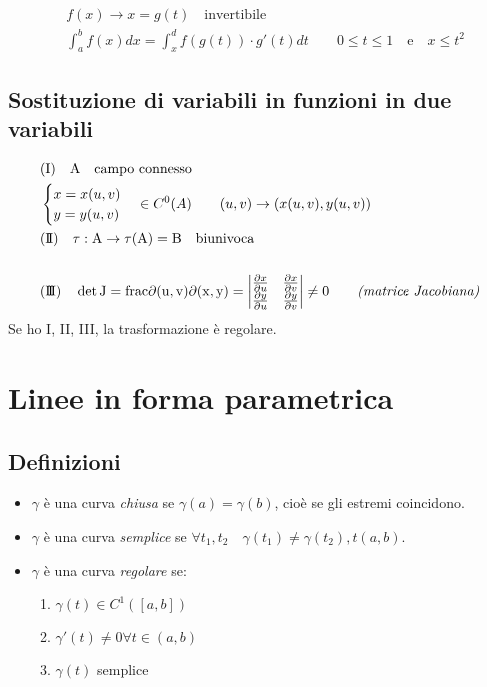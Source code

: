 \documentclass[10pt,a4paper,fleqn]{article}
\begin{document}
	\begin{equation}
	\begin{split}
	&f(x) \longrightarrow x = g(t) \quad \text{invertibile}\\
	&\int_a^b f(x)dx = \int_x^d f(g(t))\cdot g'(t)dt \qquad 0 \leq t \leq 1 \quad\text{e}\quad x \leq t^2
	\end{split}
	\end{equation}

	\subsection{Sostituzione di variabili in funzioni in due variabili}

	\begin{equation}
	\begin{split}
	&(\rm I)\quad A \quad\text{campo connesso}\\
	&\begin{cases}
	x=x(u,v)\\ y=y(u,v)
	\end{cases} \in C^0(A) \qquad (u,v) \rightarrow (x(u,v),y(u,v))\\
	&(\rm I\!I)\quad\tau: A \rightarrow \tau(A)=B \quad\text{biunivoca}\\\\
	&(\rm I\!I\!I)\quad\det J=frac{\partial(u,v)}{\partial(x,y)} = \begin{vmatrix}
	\frac{\partial x}{\partial u} & \frac{\partial x}{\partial v}\\
	\frac{\partial y}{\partial u} & \frac{\partial y}{\partial v}
	\end{vmatrix} \neq 0 \qquad \textit{(matrice Jacobiana)}\\
	\end{split}
	\end{equation}
	Se ho \rm I, \rm I\!I, \rm I\!I\!I, la trasformazione è regolare.
	\section{Linee in forma parametrica}

	\subsection{Definizioni}

	\begin{itemize}
	\item $\gamma$ è una curva \emph{chiusa} se $\gamma(a)=\gamma(b)$, cioè se gli estremi coincidono.
	\item $\gamma$ è una curva \emph{semplice} se $\forall t_1, t_2 \quad \gamma(t_1) \neq \gamma(t_2), t(a,b)$.
	\item $\gamma$ è una curva \emph{regolare} se:
	\begin{enumerate}
		\item $\gamma(t) \in C^1([a,b])$
		\item $\gamma'(t)\neq 0 \forall t \in (a,b)$
		\item $\gamma(t)$ semplice
	\end{enumerate}
	\end{itemize}
\end{document}
